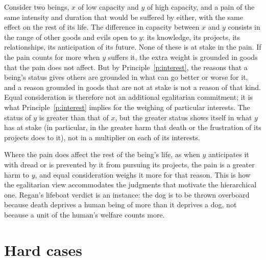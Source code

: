 \documentclass{situationist-preprint}
\begin{document}
Consider two beings, $x$ of low capacity and $y$ of high capacity, and a pain of the same intensity and duration that would be suffered by either, with the same effect on the rest of its life. The difference in capacity between $x$ and $y$ consists in the range of other goods and evils open to $y$: its knowledge, its projects, its relationships, its anticipation of its future. None of these is at stake in the pain. If the pain counts for more when $y$ suffers it, the extra weight is grounded in goods that the pain does not affect. But by Principle~\ref{p:interest}, the reasons that a being's status gives others are grounded in what can go better or worse for it, and a reason grounded in goods that are not at stake is not a reason of that kind. Equal consideration is therefore not an additional egalitarian commitment; it is what Principle~\ref{p:interest} implies for the weighing of particular interests. The status of $y$ is greater than that of $x$, but the greater status shows itself in what $y$ has at stake (in particular, in the greater harm that death or the frustration of its projects does to it), not in a multiplier on each of its interests.

Where the pain does affect the rest of the being's life, as when $y$ anticipates it with dread or is prevented by it from pursuing its projects, the pain is a greater harm to $y$, and equal consideration weighs it more for that reason. This is how the egalitarian view accommodates the judgments that motivate the hierarchical one. Regan's lifeboat verdict is an instance: the dog is to be thrown overboard because death deprives a human being of more than it deprives a dog, not because a unit of the human's welfare counts more.

\section{Hard cases}\label{s:cases}
\end{document}
